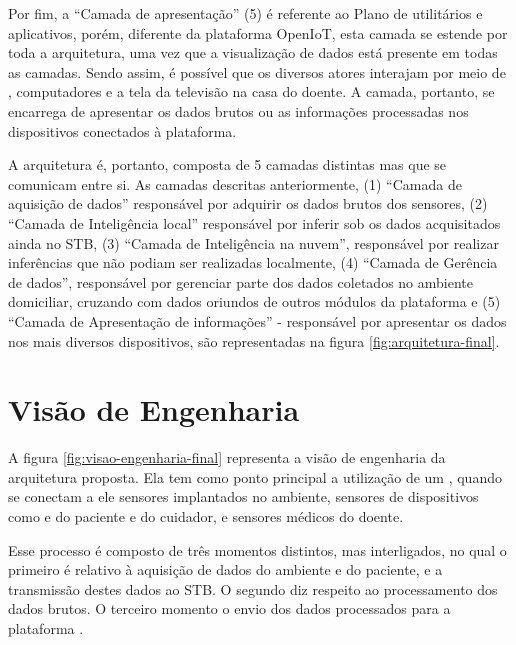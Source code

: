 Por fim, a ``Camada de apresentação'' (5) é referente ao Plano de utilitários e
aplicativos, porém, diferente da plataforma OpenIoT, esta camada se estende por
toda a arquitetura, uma vez que a visualização de dados está presente em todas 
as camadas. Sendo assim, é possível que os diversos atores interajam por meio de
\smartphones, computadores e a tela da televisão na casa do doente.
A camada, portanto, se encarrega de apresentar os dados brutos ou as informações
processadas nos dispositivos conectados à plataforma. 

A arquitetura é, portanto, composta de 5 camadas distintas mas que se comunicam
entre si. As camadas descritas anteriormente, (1) ``Camada de aquisição de
dados'' responsável por adquirir os dados brutos dos sensores, (2) ``Camada de
Inteligência local'' responsável por inferir sob os dados acquisitados ainda no
STB, (3) ``Camada de Inteligência na nuvem'', responsável por realizar
inferências que não podiam ser realizadas localmente, (4) ``Camada de Gerência
de dados'', responsável por gerenciar parte dos dados coletados no ambiente
domiciliar, cruzando com dados oriundos de outros módulos da plataforma
\nextsaude[] e (5) ``Camada de Apresentação de informações'' - responsável por
apresentar os dados nos mais diversos dispositivos, são representadas na figura
\ref{fig:arquitetura-final}.


\section{Visão de Engenharia} \label{sec:visao-engenharia}

A figura \ref{fig:visao-engenharia-final} representa a visão de engenharia da arquitetura
proposta. Ela tem como ponto principal a utilização de um \stb[], quando se
conectam a ele sensores  implantados no ambiente, sensores de dispositivos como
\smartphones[] e  \smartwatches[] do paciente e do cuidador, e sensores médicos
do doente.

Esse processo é composto de três momentos distintos, mas interligados, no qual
o primeiro é relativo à aquisição de dados do ambiente e do paciente, e a
transmissão destes dados ao STB. O segundo diz respeito ao processamento dos
dados brutos. O terceiro momento o envio dos dados processados para a plataforma
\nextsaude[].


